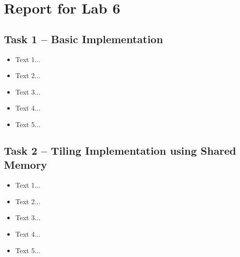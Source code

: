\documentclass[a4paper, DIV12, headsepline]{scrartcl}
\begin{document}
\section*{Report for Lab 6}
\subsection*{Task 1 -- Basic Implementation}
\begin{itemize}
\item Text 1...

\item Text 2...

\item Text 3...

\item Text 4...

\item Text 5...

\end{itemize}

\subsection*{Task 2 -- Tiling Implementation using Shared Memory}
\begin{itemize}
\item Text 1...

\item Text 2...

\item Text 3...

\item Text 4...

\item Text 5...

\end{itemize}
\end{document}
